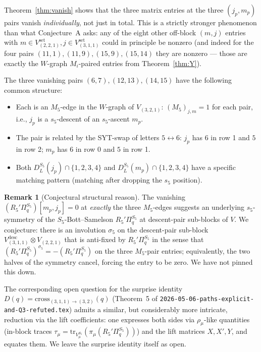 \documentclass[11pt]{article}
\theoremstyle{definition}
\newtheorem{remark}[theorem]{Remark}
\begin{document}
Theorem~\ref{thm:vanish} shows that the three matrix entries at the three $(j_p, m_p)$ pairs vanish \emph{individually}, not just in total. This is a strictly stronger phenomenon than what Conjecture~A asks: any of the eight other off-block $(m, j)$ entries with $m \in V_{(2,2,1)}^{\mathrm{set}}, j \in V_{(3,1,1)}^{\mathrm{set}}$ could in principle be nonzero (and indeed for the four pairs $(11,1), (11,9), (15,9), (15,14)$ they are nonzero --- those are exactly the $W$-graph $M_i$-paired entries from Theorem~\ref{thm:Y}).

The three vanishing pairs $(6,7), (12,13), (14,15)$ have the following common structure:
\begin{itemize}[leftmargin=2em,topsep=0.2em,itemsep=0.2em]
\item Each is an $M_5$-edge in the $W$-graph of $V_{(3,2,1)}$: $(M_5)_{j, m} = 1$ for each pair, i.e., $j_p$ is a $s_5$-descent of an $s_5$-ascent $m_p$.
\item The pair is related by the SYT-swap of letters $5 \leftrightarrow 6$: $j_p$ has $6$ in row 1 and $5$ in row 2; $m_p$ has $6$ in row 0 and $5$ in row 1.
\item Both $D_L^{S_5}(j_p) \cap \{1,2,3,4\}$ and $D_L^{S_5}(m_p) \cap \{1,2,3,4\}$ have a specific matching pattern (matching after dropping the $s_5$ position).
\end{itemize}

\begin{remark}[Conjectural structural reason]\label{rem:why}
The vanishing $(R_5'\Pi_q^{S_5})[m_p, j_p] = 0$ at \emph{exactly} the three $M_5$-edges suggests an underlying $s_5$-symmetry of the $S_5$-Bott--Samelson $R_5'\Pi_q^{S_5}$ at descent-pair sub-blocks of $V$. We conjecture: there is an involution $\sigma_5$ on the descent-pair sub-block $V_{(3,1,1)}^{\mathrm{desc}} \otimes V_{(2,2,1)}$ that is anti-fixed by $R_5'\Pi_q^{S_5}$ in the sense that $(R_5'\Pi_q^{S_5})^{\sigma_5} = -(R_5'\Pi_q^{S_5})$ on the three $M_5$-pair entries; equivalently, the two halves of the symmetry cancel, forcing the entry to be zero. We have not pinned this down.
\end{remark}

The corresponding open question for the surprise identity $D(q) = \mathrm{cross}_{(3,1,1) \to (3,2)}(q)$ (Theorem~5 of \texttt{2026-05-06-paths-explicit-and-Q3-refuted.tex}) admits a similar, but considerably more intricate, reduction via the lift coefficients: one expresses both sides via $\rho_\mu$-like quantities (in-block traces $\tau_\mu = \mathrm{tr}_{V_\mu^{S_5}}(\pi_\mu(R_5'\Pi_q^{S_5}))$) and the lift matrices $X, X', Y$, and equates them. We leave the surprise identity itself as open.
\end{document}
